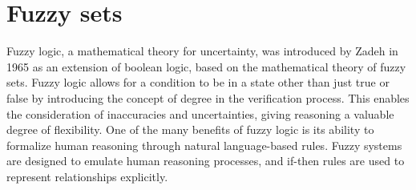 \section{Fuzzy sets}


Fuzzy logic, a mathematical theory for uncertainty, was introduced by Zadeh in 1965 as an extension of boolean logic, based on the mathematical theory of fuzzy sets. Fuzzy logic allows for a condition to be in a state other than just true or false by introducing the concept of degree in the verification process. This enables the consideration of inaccuracies and uncertainties, giving reasoning a valuable degree of flexibility. One of the many benefits of fuzzy logic is its ability to formalize human reasoning through natural language-based rules. Fuzzy systems are designed to emulate human reasoning processes, and if-then rules are used to represent relationships explicitly.